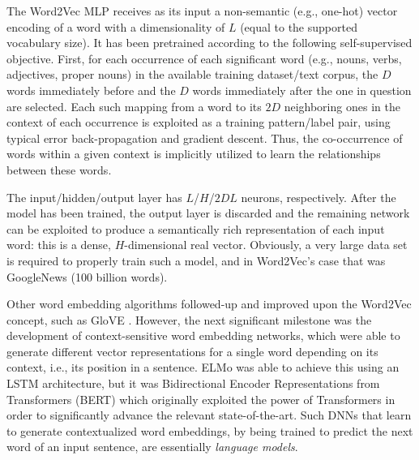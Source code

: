 \documentclass[preprint,review,10pt]{elsarticle}
\begin{document}
	The Word2Vec MLP receives as its input a non-semantic (e.g., one-hot) vector encoding of a word with a dimensionality of $L$ (equal to the supported vocabulary size). It has been pretrained according to the following self-supervised objective. First, for each occurrence of each significant word (e.g., nouns, verbs, adjectives, proper nouns) in the available training dataset/text corpus, the $D$ words immediately before and the $D$ words immediately after the one in question are selected. Each such mapping from a word to its $2D$ neighboring ones in the context of each occurrence is exploited as a training pattern/label pair, using typical error back-propagation and gradient descent. Thus, the co-occurrence of words within a given context is implicitly utilized to learn the relationships between these words.
	
	The input/hidden/output layer has $L$/$H$/$2DL$ neurons, respectively. After the model has been trained, the output layer is discarded and the remaining network can be exploited to produce a semantically rich representation of each input word: this is a dense, $H$-dimensional real vector. Obviously, a very large data set is required to properly train such a model, and in Word2Vec's case that was GoogleNews (100 billion words).
	
	Other word embedding algorithms followed-up and improved upon the Word2Vec concept, such as GloVE \cite{glove}. However, the next significant milestone was the development of context-sensitive word embedding networks, which were able to generate different vector representations for a single word depending on its context, i.e., its position in a sentence. ELMo \cite{elmo} was able to achieve this using an LSTM architecture, but it was Bidirectional Encoder Representations from Transformers (BERT) \cite{toutanova} which originally exploited the power of Transformers in order to significantly advance the relevant state-of-the-art. Such DNNs that learn to generate contextualized word embeddings, by being trained to predict the next word of an input sentence, are essentially \textit{language models}.
	
\end{document}
